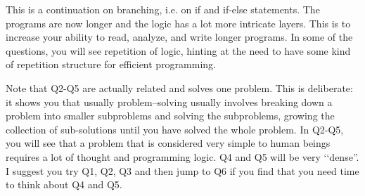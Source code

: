 This is a continuation on branching, i.e. on if and if-else statements. 
The programs are now longer and the logic has a lot more
intricate layers.
This is to increase your ability to read, analyze, and write longer programs.
In some of the questions, you will see repetition of logic, hinting
at the need to have some kind of repetition structure for 
efficient programming.

Note that Q2-Q5 are actually related and solves one problem.
This is deliberate: it shows you that usually problem--solving
usually involves breaking down a problem into smaller subproblems
and solving the subproblems, growing the collection of sub-solutions
until you have solved the whole problem.
In Q2-Q5, you will see that  
a problem that is considered
very simple to human beings requires 
a lot of thought and 
programming logic. 
Q4 and Q5 will be very \lq\lq dense''.
I suggest you try Q1, Q2, Q3 and then jump to Q6 if you find
that you need time to think about Q4 and Q5.
